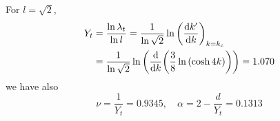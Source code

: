 \documentclass[../main/main.tex]{subfiles}
\begin{document}
\begin{example}
\begin{enumerate}
For \( l = \sqrt{2}  \),
\begin{equation}
\begin{split}
Y_t  &= \frac{\ln{\lambda _t} }{\ln{l} } = \frac{1}{\ln{\sqrt{2} } } \ln{\qty(\dv{k'}{k})_{k=k_c} }   \\
& = \frac{1}{\ln{\sqrt{2} } }  \ln{\qty(\dv{}{k} \qty(\frac{3}{8} \ln{(\cosh 4k)} ) ) } = 1.070
\end{split}
\end{equation}
we have also
\begin{equation}
  \nu = \frac{1}{Y_t} = 0.9345, \quad \alpha = 2 - \frac{d}{Y_t} = 0.1313
\end{equation}
\end{enumerate}

\end{example}
\end{document}
